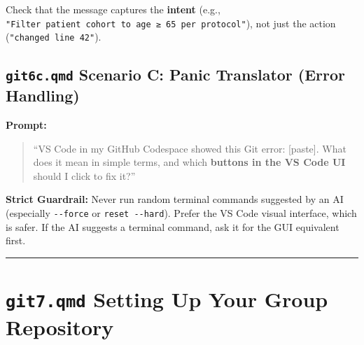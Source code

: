 \documentclass[
  letterpaper,
  DIV=11,
  numbers=noendperiod,
  oneside]{scrreprt}
\begin{document}
Check that the message captures the \textbf{intent} (e.g.,
\texttt{"Filter\ patient\ cohort\ to\ age\ ≥\ 65\ per\ protocol"}), not
just the action (\texttt{"changed\ line\ 42"}).

\subsection*{\texorpdfstring{\texttt{git6c.qmd} Scenario C: Panic
Translator (Error
Handling)}{git6c.qmd Scenario C: Panic Translator (Error Handling)}}\label{git6c.qmd-scenario-c-panic-translator-error-handling}

\textbf{Prompt:}

\begin{quote}
``VS Code in my GitHub Codespace showed this Git error: {[}paste{]}.
What does it mean in simple terms, and which \textbf{buttons in the VS
Code UI} should I click to fix it?''
\end{quote}

\begin{tcolorbox}[enhanced jigsaw, title=\textcolor{quarto-callout-warning-color}{\faExclamationTriangle}\hspace{0.5em}{Warning}, arc=.35mm, toptitle=1mm, colframe=quarto-callout-warning-color-frame, toprule=.15mm, leftrule=.75mm, bottomtitle=1mm, opacityback=0, bottomrule=.15mm, coltitle=black, breakable, opacitybacktitle=0.6, titlerule=0mm, colback=white, left=2mm, colbacktitle=quarto-callout-warning-color!10!white, rightrule=.15mm]

\textbf{Strict Guardrail:} Never run random terminal commands suggested
by an AI (especially \texttt{-\/-force} or \texttt{reset\ -\/-hard}).
Prefer the VS Code visual interface, which is safer. If the AI suggests
a terminal command, ask it for the GUI equivalent first.

\end{tcolorbox}

\begin{center}\rule{0.5\linewidth}{0.5pt}\end{center}

\section*{\texorpdfstring{\texttt{git7.qmd} Setting Up Your Group
Repository}{git7.qmd Setting Up Your Group Repository}}\label{git7.qmd-setting-up-your-group-repository}
\end{document}

